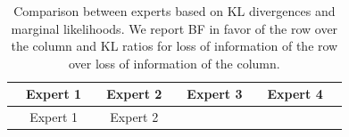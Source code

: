 \documentclass[openright,titlepage,12pt,a4paper]{book}
\begin{document}
\vspace*{1cm}

\begin{longtable}[]{@{}lclclclcl@{}}
\caption{\label{tab:ch03tab4} Comparison between experts based on KL divergences and marginal likelihoods. We report BF in favor of the row over the column and KL ratios for loss of information of the row over loss of information of the column.}\tabularnewline
\toprule
\begin{minipage}[b]{0.11\columnwidth}\raggedright
\strut
\end{minipage} & \begin{minipage}[b]{0.10\columnwidth}\centering
Expert 1\strut
\end{minipage} & \begin{minipage}[b]{0.06\columnwidth}\raggedright
\strut
\end{minipage} & \begin{minipage}[b]{0.11\columnwidth}\centering
Expert 2\strut
\end{minipage} & \begin{minipage}[b]{0.06\columnwidth}\raggedright
\strut
\end{minipage} & \begin{minipage}[b]{0.11\columnwidth}\centering
Expert 3\strut
\end{minipage} & \begin{minipage}[b]{0.07\columnwidth}\raggedright
\strut
\end{minipage} & \begin{minipage}[b]{0.10\columnwidth}\centering
Expert 4\strut
\end{minipage} & \begin{minipage}[b]{0.06\columnwidth}\raggedright
\strut
\end{minipage}\tabularnewline
\midrule
\endfirsthead
\toprule
\begin{minipage}[b]{0.11\columnwidth}\raggedright
\strut
\end{minipage} & \begin{minipage}[b]{0.10\columnwidth}\centering
Expert 1\strut
\end{minipage} & \begin{minipage}[b]{0.06\columnwidth}\raggedright
\strut
\end{minipage} & \begin{minipage}[b]{0.11\columnwidth}\centering
Expert 2\strut
\end{minipage} & \begin{minipage}[b]{0.06\columnwidth}\raggedright

\end{minipage}
\end{longtable}
\end{document}
